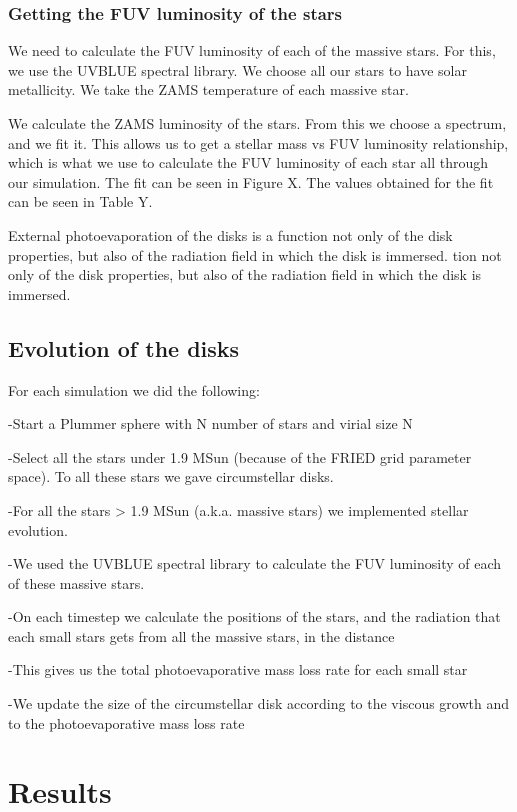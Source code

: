 \documentclass[fleqn,usenatbib]{mnras}
\begin{document}
\subsubsection{Getting the FUV luminosity of the stars}
We need to calculate the FUV luminosity of each of the massive stars. For this, we use the UVBLUE spectral library. We choose all our stars to have solar metallicity. We take the ZAMS temperature of each massive star.

We calculate the ZAMS luminosity of the stars. From this we choose a spectrum, and we fit it. This allows us to get a stellar mass vs FUV luminosity relationship, which is what we use to calculate the FUV luminosity of each star all through our simulation. The fit can be seen in Figure X. The values obtained for the fit can be seen in Table Y.

External photoevaporation of the disks is a function not only of the disk properties, but also of the radiation field in which the disk is immersed. tion not only of the disk properties, but also of the radiation field in which the disk is immersed. 

\subsection{Evolution of the disks}
For each simulation we did the following:

-Start a Plummer sphere with N number of stars and virial size N

-Select all the stars under 1.9 MSun (because of the FRIED grid parameter space). To all these stars we gave circumstellar disks.

-For all the stars > 1.9 MSun (a.k.a. massive stars) we implemented stellar evolution.

-We used the UVBLUE spectral library to calculate the FUV luminosity of each of these massive stars.

-On each timestep we calculate the positions of the stars, and the radiation that each small stars gets from all the massive stars, in the distance

-This gives us the total photoevaporative mass loss rate for each small star

-We update the size of the circumstellar disk according to the viscous growth and to the photoevaporative mass loss rate

\section{Results}
\label{sec:results}
\end{document}
